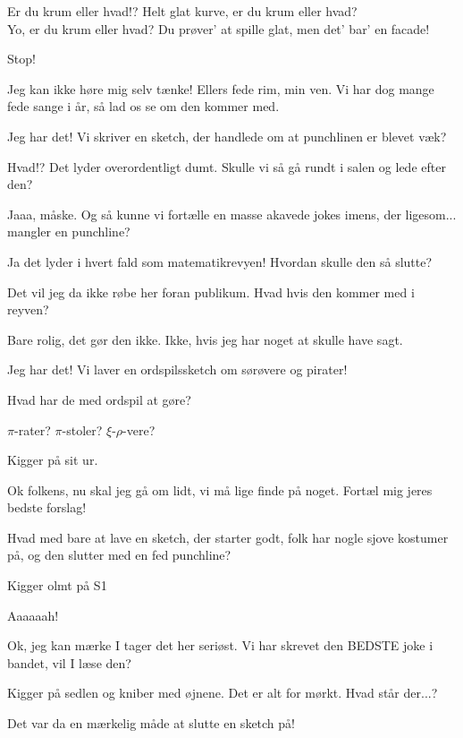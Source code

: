 \documentclass[a4paper,11pt]{article}
\begin{document}
\begin{sketch}

 Er du krum eller hvad!? Helt glat kurve, er du krum eller hvad? \\
Yo, er du krum eller hvad? Du prøver' at spille glat, men det' bar' en facade!

 Stop!


 Jeg kan ikke høre mig selv tænke! Ellers fede rim, min ven. Vi har dog mange fede sange i år, så lad os se om den kommer med.


 Jeg har det! Vi skriver en sketch, der handlede om at punchlinen er blevet væk?

 Hvad!? Det lyder overordentligt dumt. Skulle vi så gå rundt i salen og lede efter den?

 Jaaa, måske. Og så kunne vi fortælle en masse akavede jokes imens, der ligesom... mangler en punchline?

 Ja det lyder i hvert fald som matematikrevyen! Hvordan skulle den så slutte?

 Det vil jeg da ikke røbe her foran publikum. Hvad hvis den kommer med i reyven?

 Bare rolig, det gør den ikke. Ikke, hvis jeg har noget at skulle have sagt.

 Jeg har det! Vi laver en ordspilssketch om sørøvere og pirater!

 Hvad har de med ordspil at gøre?

 $\pi$-rater? $\pi$-stoler? $\xi$-$\rho$-vere?

 Kigger på sit ur.

 Ok folkens, nu skal jeg gå om lidt, vi må lige finde på noget. Fortæl mig jeres bedste forslag!

 Hvad med bare at lave en sketch, der starter godt, folk har nogle sjove kostumer på, og den slutter med en fed punchline?

 Kigger olmt på S1

 Aaaaaah!



 Ok, jeg kan mærke I tager det her seriøst. Vi har skrevet den BEDSTE joke i bandet, vil I læse den?


 Kigger på sedlen og kniber med øjnene.  Det er alt for mørkt. Hvad står der...?



 Det var da en mærkelig måde at slutte en sketch på!

\end{sketch}
\end{document}
